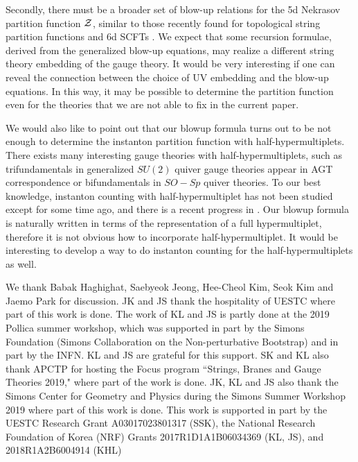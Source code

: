 \documentclass[letterpaper, 11pt]{article}
\def\CZ{{\cal Z}}
\begin{document}
{Secondly, there must be a broader set of blow-up relations for the 5d Nekrasov partition function $\CZ$, similar to those recently found for topological string partition functions and 6d SCFTs \cite{Grassi:2016nnt, Gu:2017ccq, Huang:2017mis, Gu:2018gmy,Gu:2019dan}. We expect that some recursion formulae, derived from the generalized blow-up equations, may realize a different string theory embedding of the gauge theory. It would be very interesting if one can reveal the connection between the choice of UV embedding and the blow-up equations. In this way, it may be possible to determine the partition function even for the theories that we are not able to fix in the current paper. 

We would also like to point out that our blowup formula turns out to be not enough to determine the instanton partition function with half-hypermultiplets. There exists many interesting gauge theories with half-hypermultiplets, such as trifundamentals in generalized $SU(2)$ quiver gauge theories \cite{Gaiotto:2009we} appear in AGT correspondence \cite{Alday:2009aq} or bifundamentals in $SO-Sp$ quiver theories. To our best knowledge, instanton counting with half-hypermultiplet has not been studied except for \cite{Hollands:2010xa, Hollands:2011zc} some time ago, and there is a recent progress in \cite{Coman:2019eex}. Our blowup formula is naturally written in terms of the representation of a full hypermultiplet, therefore it is not obvious how to incorporate half-hypermultiplet. It would be interesting to develop a way to do instanton counting for the half-hypermultiplets as well. 


\acknowledgments
We thank Babak Haghighat, Saebyeok Jeong, Hee-Cheol Kim, Seok Kim and Jaemo Park for discussion. 
JK and JS thank the hospitality of UESTC where part of this work is done. 
The work of KL and JS is partly done at the 2019 Pollica summer workshop, which was supported in part by the Simons Foundation (Simons Collaboration on the Non-perturbative Bootstrap) and in part by the INFN. KL and JS are grateful for this support.
SK and KL also thank APCTP for hosting the Focus program ``Strings, Branes and Gauge Theories 2019," where part of the work is done.
JK, KL and JS also thank the Simons Center for Geometry and Physics during the Simons Summer Workshop 2019 where part of this work is done. 
This work is supported in part by the UESTC Research Grant A03017023801317 (SSK), the National Research Foundation of Korea (NRF) Grants 2017R1D1A1B06034369 (KL, JS), and 2018R1A2B6004914 (KHL)

}
\end{document}
